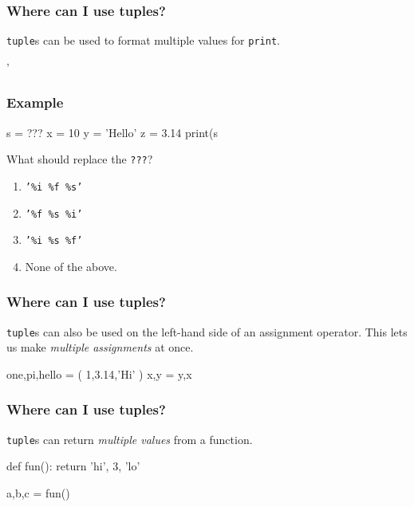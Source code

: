 \documentclass[11pt]{beamer}
\begin{document}
\begin{frame}[fragile]
  \frametitle{Where can I use tuples?}
  \Enlarge

  \begin{itemize}
  \myitem  \texttt{tuple}s can be used to format multiple values for \texttt{print}.
  \end{itemize}
  \begin{semiverbatim}
'%
  \end{semiverbatim}
\end{frame}

\begin{frame}[fragile]
  \frametitle{Example}
  \Enlarge

  \begin{semiverbatim}
s = ???
x = 10
y = 'Hello'
z = 3.14
print(s %
  \end{semiverbatim}
  What should replace the \texttt{???}?
  \begin{enumerate}[label=\Alph*]
  \item  \texttt{'\%i \%f \%s'}
  \item  \texttt{'\%f \%s \%i'}
  \item  \texttt{'\%i \%s \%f'} %
  \item  None of the above.
  \end{enumerate}
\end{frame}

\begin{frame}[fragile]
  \frametitle{Where can I use tuples?}
  \Enlarge

  \begin{itemize}
  \myitem  \texttt{tuple}s can also be used on the left-hand side of an assignment operator. %
  \myitem  This lets us make \emph{multiple assignments} at once. %
  \end{itemize}
  \begin{semiverbatim}
one,pi,hello = ( 1,3.14,'Hi' ) \pause
x,y = y,x
  \end{semiverbatim}
\end{frame}

\begin{frame}[fragile]
  \frametitle{Where can I use tuples?}
  \Enlarge

  \begin{itemize}
  \myitem  \texttt{tuple}s can return \emph{multiple values} from a function. %
  \end{itemize}
  \begin{semiverbatim}
def fun():
    return 'hi', 3, 'lo'

a,b,c = fun()
  \end{semiverbatim}
\end{frame}
\end{document}
